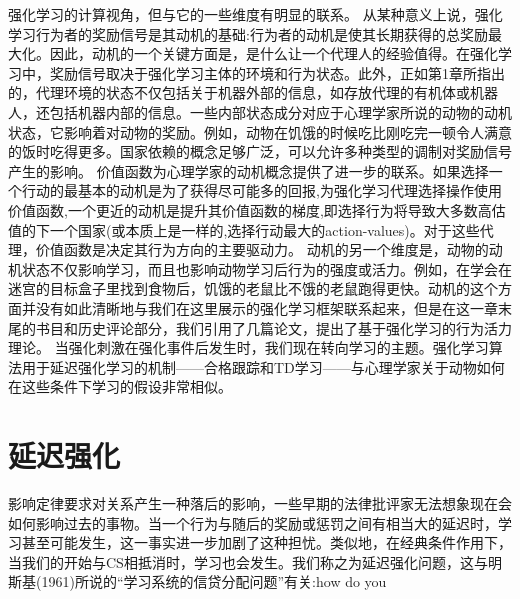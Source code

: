 强化学习的计算视角，但与它的一些维度有明显的联系。
从某种意义上说，强化学习行为者的奖励信号是其动机的基础:行为者的动机是使其长期获得的总奖励最大化。因此，动机的一个关键方面是，是什么让一个代理人的经验值得。在强化学习中，奖励信号取决于强化学习主体的环境和行为状态。此外，正如第1章所指出的，代理环境的状态不仅包括关于机器外部的信息，如存放代理的有机体或机器人，还包括机器内部的信息。一些内部状态成分对应于心理学家所说的动物的动机状态，它影响着对动物的奖励。例如，动物在饥饿的时候吃比刚吃完一顿令人满意的饭时吃得更多。国家依赖的概念足够广泛，可以允许多种类型的调制对奖励信号产生的影响。
价值函数为心理学家的动机概念提供了进一步的联系。如果选择一个行动的最基本的动机是为了获得尽可能多的回报,为强化学习代理选择操作使用价值函数,一个更近的动机是提升其价值函数的梯度,即选择行为将导致大多数高估值的下一个国家(或本质上是一样的,选择行动最大的action-values)。对于这些代理，价值函数是决定其行为方向的主要驱动力。
动机的另一个维度是，动物的动机状态不仅影响学习，而且也影响动物学习后行为的强度或活力。例如，在学会在迷宫的目标盒子里找到食物后，饥饿的老鼠比不饿的老鼠跑得更快。动机的这个方面并没有如此清晰地与我们在这里展示的强化学习框架联系起来，但是在这一章末尾的书目和历史评论部分，我们引用了几篇论文，提出了基于强化学习的行为活力理论。
当强化刺激在强化事件后发生时，我们现在转向学习的主题。强化学习算法用于延迟强化学习的机制——合格跟踪和TD学习——与心理学家关于动物如何在这些条件下学习的假设非常相似。


\section{延迟强化}

影响定律要求对关系产生一种落后的影响，一些早期的法律批评家无法想象现在会如何影响过去的事物。当一个行为与随后的奖励或惩罚之间有相当大的延迟时，学习甚至可能发生，这一事实进一步加剧了这种担忧。类似地，在经典条件作用下，当我们的开始与CS相抵消时，学习也会发生。我们称之为延迟强化问题，这与明斯基(1961)所说的“学习系统的信贷分配问题”有关:how do you

